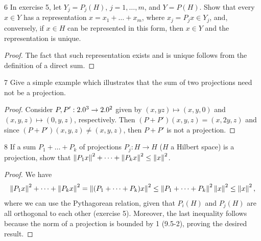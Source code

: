 \begin{exercise}{6}
In exercise 5, let $Y_j = P_j(H)$, $j = 1, \dots, m$, and $Y = P(H)$.
Show that every $x \in Y$ has a representation $x = x_1 + \dots + x_m$, where $x_j = P_j x \in Y_j$, and, conversely, if $x \in H$ can be represented in this form, then $x \in Y$ and the representation is unique.
\end{exercise}
\begin{proof}
The fact that such representation exists and is unique follows from the definition of a direct sum.
\end{proof} 

\begin{exercise}{7}
Give a simple example which illustrates that the sum of two projections need not be a projection.
\end{exercise}
\begin{proof}
Consider $P, P': 2.0^3 \to 2.0^2$ given by $(x, y z) \mapsto (x, y, 0)$ and $(x, y, z) \mapsto (0, y, z)$, respectively. Then $(P + P')(x, y, z) = (x, 2y, z)$ and since $(P + P')(x, y, z) \neq (x, y, z)$, then $P + P'$ is not a projection.
\end{proof} 

\begin{exercise}{8}
If a sum $P_1 + \dots + P_k$ of projections $P_j: H \to H$ ($H$ a Hilbert space) is a projection, show that $\left\lVert P_1 x\right\rVert^2 + \dots + \left\lVert P_k x\right\rVert^2 \leq \left\lVert x\right\rVert^2$.
\end{exercise}
\begin{proof}
We have 
\begin{align*}
    \left\lVert P_1 x\right\rVert^2 + \dots + \left\lVert P_k x\right\rVert^2
    = \left\lVert (P_1 + \dots + P_k)x\right\rVert^2
    \leq \left\lVert P_1 + \dots + P_k\right\rVert^2 \left\lVert x\right\rVert^2
    \leq \left\lVert x\right\rVert^2,
\end{align*}
where we can use the Pythagorean relation, given that $P_i(H)$ and $P_j(H)$ are all orthogonal to each other (exercise 5).
Moreover, the last inequality follows because the norm of a projection is bounded by 1 (9.5-2), proving the desired result.
\end{proof} 

